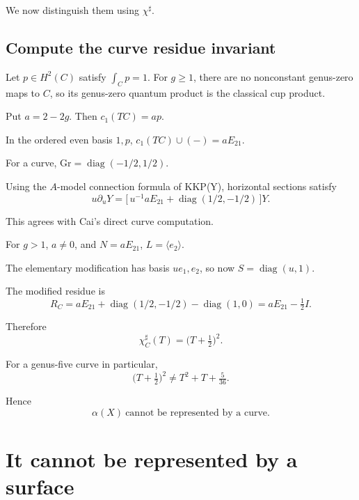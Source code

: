 \documentclass[11pt]{article}
\theoremstyle{definition}
\theoremstyle{remark}
\begin{document}
We now distinguish them using $\chi^\sharp$.

\subsection*{Compute the curve residue invariant}

Let $p\in H^2(C)$ satisfy $\int_Cp=1$. For $g\ge1$, there are no nonconstant
genus-zero maps to $C$, so its genus-zero quantum product is the classical cup
product.

Put $a=2-2g$. Then $c_1(TC)=ap$.

In the ordered even basis $1,p$, $c_1(TC)\cup(-)=aE_{21}$.

For a curve, $\mathrm{Gr}=\operatorname{diag}(-1/2,1/2)$.

Using the $A$-model connection formula of KKP(Y), horizontal sections satisfy
\begin{equation}
  u\partial_uY=\bigl[\,u^{-1}aE_{21}+\operatorname{diag}(1/2,-1/2)\,\bigr]Y.
  \tag{36}
\end{equation}

This agrees with Cai's direct curve computation.

For $g>1$, $a\ne0$, and $N=aE_{21}$, $L=\langle e_2\rangle$.

The elementary modification has basis $ue_1,e_2$, so now
$S=\operatorname{diag}(u,1)$.

The modified residue is
\begin{equation}
  R_C=aE_{21}+\operatorname{diag}(1/2,-1/2)-\operatorname{diag}(1,0)
  =aE_{21}-\tfrac12I.
  \tag{37}
\end{equation}

Therefore
\begin{equation}
  \boxed{\ \chi^\sharp_C(T)=\bigl(T+\tfrac12\bigr)^2.\ }
  \tag{38}
\end{equation}

For a genus-five curve in particular,
\begin{equation}
  \bigl(T+\tfrac12\bigr)^2\ne T^2+T+\tfrac{5}{36}.
  \tag{39}
\end{equation}

Hence
\begin{equation}
  \boxed{\ \alpha(X)\ \text{cannot be represented by a curve.}\ }
  \tag{40}
\end{equation}

\section{It cannot be represented by a surface}
\end{document}
